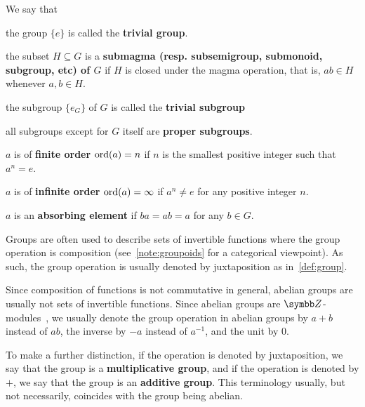 \begin{definition}
  We say that
  \begin{defenum}
    \item\label{def:group/trivial_group} the group \( \{ e \} \) is called the \textbf{trivial group}.
    \item\label{def:group/subgroup} the subset \( H \subseteq G \) is a \textbf{submagma (resp. subsemigroup, submonoid, subgroup, etc) of \( G \)} if \( H \) is closed under the magma operation, that is, \( ab \in H \) whenever \( a, b \in H \).
    \item\label{def:group/trivial_subgroup} the subgroup \( \{ e_G \} \) of \( G \) is called the \textbf{trivial subgroup}
    \item\label{def:group/proper_subgroup} all subgroups except for \( G \) itself are \textbf{proper subgroups}.
    \item\label{def:group/finite_order} \( a \) is of \textbf{finite order} \( \operatorname{ord}(a) = n \) if \( n \) is the smallest positive integer such that \( a^n = e \).
    \item\label{def:group/infinite_order} \( a \) is of \textbf{infinite order} \( \operatorname{ord}(a) = \infty \) if \( a^n \neq e \) for any positive integer \( n \).
    \item\label{def:group/absorbing_element} \( a \) is an \textbf{absorbing element} if \( ba = ab = a \) for any \( b \in G \).
  \end{defenum}
\end{definition}

\begin{note}\label{note:additive_group}
  Groups are often used to describe sets of invertible functions where the group operation is composition (see~\cref{note:groupoids} for a categorical viewpoint). As such, the group operation is usually denoted by juxtaposition as in~\cref{def:group}.

  Since composition of functions is not commutative in general, abelian groups are usually not sets of invertible functions. Since abelian groups are \( \BB{Z} \)-modules~, we usually denote the group operation in abelian groups by \( a + b \) instead of \( ab \), the inverse by \( -a \) instead of \( a^{-1} \), and the unit by \( 0 \).

  To make a further distinction, if the operation is denoted by juxtaposition, we say that the group is a \textbf{multiplicative group}, and if the operation is denoted by \( + \), we say that the group is an \textbf{additive group}. This terminology usually, but not necessarily, coincides with the group being abelian.
\end{note}

